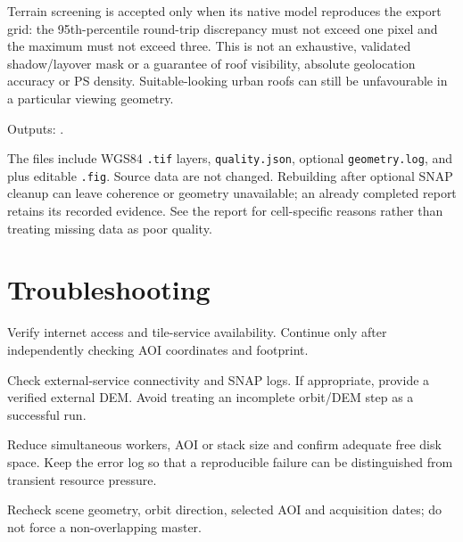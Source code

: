 Terrain screening is accepted only when its native model reproduces the export grid: the 95th-percentile round-trip discrepancy must not exceed one pixel and the maximum must not exceed three. This is not an exhaustive, validated shadow/layover mask or a guarantee of roof visibility, absolute geolocation accuracy or PS density. Suitable-looking urban roofs can still be unfavourable in a particular viewing geometry.

Outputs: .\par
The files include WGS84 \texttt{.tif} layers, \texttt{quality.json}, optional \texttt{geometry.log}, and  plus editable \texttt{.fig}. Source data are not changed. Rebuilding after optional SNAP cleanup can leave coherence or geometry unavailable; an already completed report retains its recorded evidence. See the report for cell-specific reasons rather than treating missing data as poor quality.

\section{Troubleshooting}
\begin{description}[style=nextline]
\item[Missing basemap] Verify internet access and tile-service availability. Continue only after independently checking AOI coordinates and footprint.
\item[Orbit or DEM download failure] Check external-service connectivity and SNAP logs. If appropriate, provide a verified external DEM. Avoid treating an incomplete orbit/DEM step as a successful run.
\item[SNAP memory or process failure] Reduce simultaneous workers, AOI or stack size and confirm adequate free disk space. Keep the error log so that a reproducible failure can be distinguished from transient resource pressure.
\item[No suitable master or burst overlap] Recheck scene geometry, orbit direction, selected AOI and acquisition dates; do not force a non-overlapping master.
\end{description}
